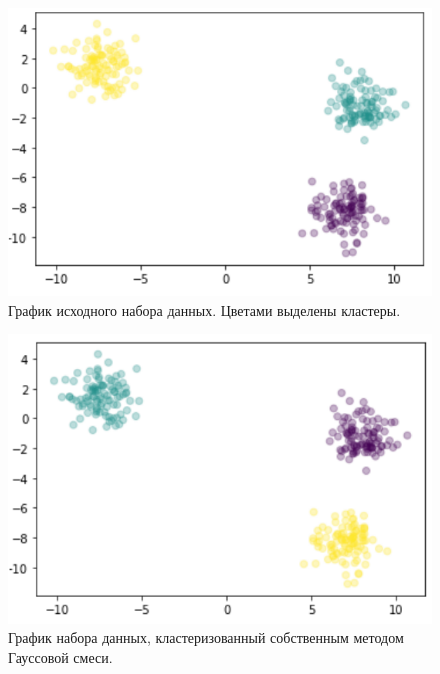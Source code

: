 \begin{figure}[H]
	\centering
	\includegraphics[width=\textwidth]{img/Clust_0.pdf}
	\caption{График исходного набора данных. Цветами выделены кластеры.}
	\label{Clust_0}
\end{figure}  

\begin{figure}[H]
	\centering
	\includegraphics[width=\textwidth]{img/Clust_1.pdf}
	\caption{График набора данных, кластеризованный собственным методом Гауссовой смеси.}
	\label{Clust_1}
\end{figure}  

